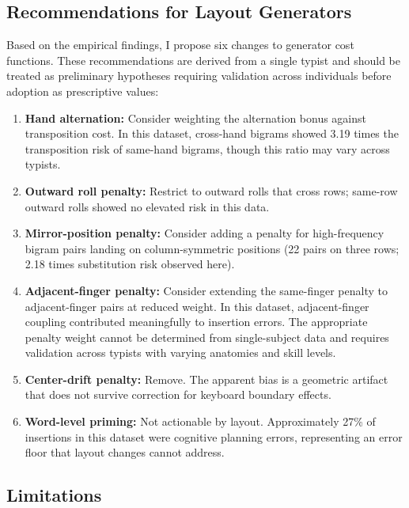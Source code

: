 \documentclass[12pt]{article}
\begin{document}
\subsection{Recommendations for Layout Generators}

Based on the empirical findings, I propose six changes to generator cost functions. These recommendations are derived from a single typist and should be treated as preliminary hypotheses requiring validation across individuals before adoption as prescriptive values:

\begin{enumerate}
    \item \textbf{Hand alternation:} Consider weighting the alternation bonus against transposition cost. In this dataset, cross-hand bigrams showed 3.19 times the transposition risk of same-hand bigrams, though this ratio may vary across typists.
    
    \item \textbf{Outward roll penalty:} Restrict to outward rolls that cross rows; same-row outward rolls showed no elevated risk in this data.
    
    \item \textbf{Mirror-position penalty:} Consider adding a penalty for high-frequency bigram pairs landing on column-symmetric positions (22 pairs on three rows; 2.18 times substitution risk observed here).
    
    \item \textbf{Adjacent-finger penalty:} Consider extending the same-finger penalty to adjacent-finger pairs at reduced weight. In this dataset, adjacent-finger coupling contributed meaningfully to insertion errors. The appropriate penalty weight cannot be determined from single-subject data and requires validation across typists with varying anatomies and skill levels.
    
    \item \textbf{Center-drift penalty:} Remove. The apparent bias is a geometric artifact that does not survive correction for keyboard boundary effects.
    
    \item \textbf{Word-level priming:} Not actionable by layout. Approximately 27\% of insertions in this dataset were cognitive planning errors, representing an error floor that layout changes cannot address.
\end{enumerate}

\subsection{Limitations}
\end{document}
